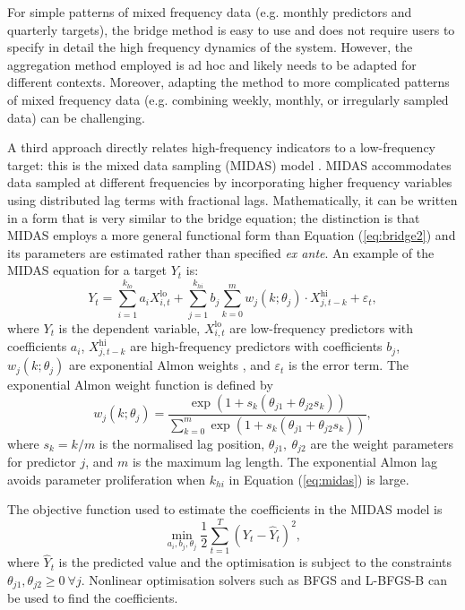 \documentclass[a4paper, 12pt]{article}
\theoremstyle{remark}
\begin{document}
For simple patterns of mixed frequency data (e.g. monthly predictors and quarterly targets), the bridge method is easy to use and does not require users to specify in detail the high frequency dynamics of the system. However, the aggregation method employed is ad hoc and likely needs to be adapted for different contexts. Moreover, adapting the method to more complicated patterns of mixed frequency data (e.g. combining weekly, monthly, or irregularly sampled data) can be challenging.

A third approach directly relates high-frequency indicators to a low-frequency target: this is the mixed data sampling (MIDAS) model \citep{ghysels2005there}. MIDAS accommodates data sampled at different frequencies by incorporating higher frequency variables using distributed lag terms with fractional lags. Mathematically, it can be written in a form that is very similar to the bridge equation; the distinction is that MIDAS employs a more general functional form than Equation (\ref{eq:bridge2}) and its parameters are estimated rather than specified \textit{ex ante}. An example of the MIDAS equation for a target $Y_{t}$ is:
\begin{equation}\label{eq:midas}
Y_t = \sum_{i=1}^{k_{lo}} a_i X^{\text{lo}}_{i,t} + \sum_{j=1}^{k_{hi}} b_j \sum_{k=0}^{m} w_j(k; \theta_j)\cdot X^{\text{hi}}_{j,t-k} + \varepsilon_t,
\end{equation}
where $Y_t$ is the dependent variable, $X^{\text{lo}}_{i,t}$ are low-frequency predictors with coefficients $a_i$, $X^{\text{hi}}_{j,t-k}$ are high-frequency predictors with coefficients $b_j$, $w_j(k; \theta_j)$ are exponential Almon weights \citep{almon1965distributed}, and $\varepsilon_t$ is the error term. The exponential Almon weight function is defined by
$$
w_j(k; \theta_j) = \frac{\exp(1 + s_k(\theta_{j1} + \theta_{j2}s_k))}{\sum_{k=0}^m \exp(1 + s_k(\theta_{j1} + \theta_{j2}s_k))},
$$
where $s_k = k/m$ is the normalised lag position, $\theta_{j1},\: \theta_{j2}$ are the weight parameters for predictor $j$, and $m$ is the maximum lag length. The exponential Almon lag avoids parameter proliferation when $k_{hi}$ in Equation (\ref{eq:midas}) is large.

The objective function used to estimate the coefficients in the MIDAS model is 
$$
\min_{{a_i, b_j, \theta_j}} \frac{1}{2}\sum_{t=1}^T (Y_t - \hat{Y}_t)^2,
$$
where $\hat{Y}_t$ is the predicted value and the optimisation is subject to the constraints $\theta_{j1}, \theta_{j2} \geq 0 \:\forall j$. Nonlinear optimisation solvers such as BFGS \citep{broyden1970convergence, fletcher1970new, goldfarb1970family, shanno1970conditioning} and L-BFGS-B \citep{byrd1995limited} can be used to find the coefficients.
\end{document}
